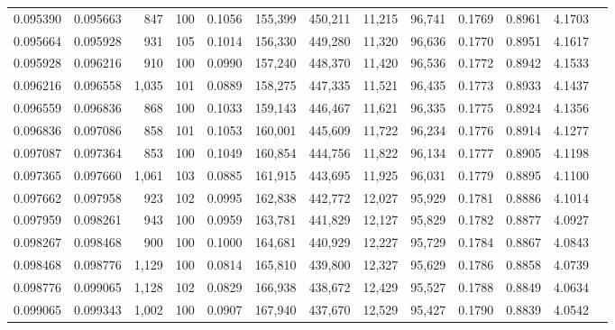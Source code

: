 \begin{tabular}{rrrrrrrrrrrrr}
0.095390 & 0.095663 &   847 & 100 &                                     0.1056 & 155,399 & 450,211 &  11,215 &  96,741 & 0.1769 & 0.8961 & 4.1703 \\
0.095664 & 0.095928 &   931 & 105 &                                     0.1014 & 156,330 & 449,280 &  11,320 &  96,636 & 0.1770 & 0.8951 & 4.1617 \\
0.095928 & 0.096216 &   910 & 100 &                                     0.0990 & 157,240 & 448,370 &  11,420 &  96,536 & 0.1772 & 0.8942 & 4.1533 \\
0.096216 & 0.096558 & 1,035 & 101 &                                     0.0889 & 158,275 & 447,335 &  11,521 &  96,435 & 0.1773 & 0.8933 & 4.1437 \\
0.096559 & 0.096836 &   868 & 100 &                                     0.1033 & 159,143 & 446,467 &  11,621 &  96,335 & 0.1775 & 0.8924 & 4.1356 \\
0.096836 & 0.097086 &   858 & 101 &                                     0.1053 & 160,001 & 445,609 &  11,722 &  96,234 & 0.1776 & 0.8914 & 4.1277 \\
0.097087 & 0.097364 &   853 & 100 &                                     0.1049 & 160,854 & 444,756 &  11,822 &  96,134 & 0.1777 & 0.8905 & 4.1198 \\
0.097365 & 0.097660 & 1,061 & 103 &                                     0.0885 & 161,915 & 443,695 &  11,925 &  96,031 & 0.1779 & 0.8895 & 4.1100 \\
0.097662 & 0.097958 &   923 & 102 &                                     0.0995 & 162,838 & 442,772 &  12,027 &  95,929 & 0.1781 & 0.8886 & 4.1014 \\
0.097959 & 0.098261 &   943 & 100 &                                     0.0959 & 163,781 & 441,829 &  12,127 &  95,829 & 0.1782 & 0.8877 & 4.0927 \\
0.098267 & 0.098468 &   900 & 100 &                                     0.1000 & 164,681 & 440,929 &  12,227 &  95,729 & 0.1784 & 0.8867 & 4.0843 \\
0.098468 & 0.098776 & 1,129 & 100 &                                     0.0814 & 165,810 & 439,800 &  12,327 &  95,629 & 0.1786 & 0.8858 & 4.0739 \\
0.098776 & 0.099065 & 1,128 & 102 &                                     0.0829 & 166,938 & 438,672 &  12,429 &  95,527 & 0.1788 & 0.8849 & 4.0634 \\
0.099065 & 0.099343 & 1,002 & 100 &                                     0.0907 & 167,940 & 437,670 &  12,529 &  95,427 & 0.1790 & 0.8839 & 4.0542 \\

\end{tabular}
